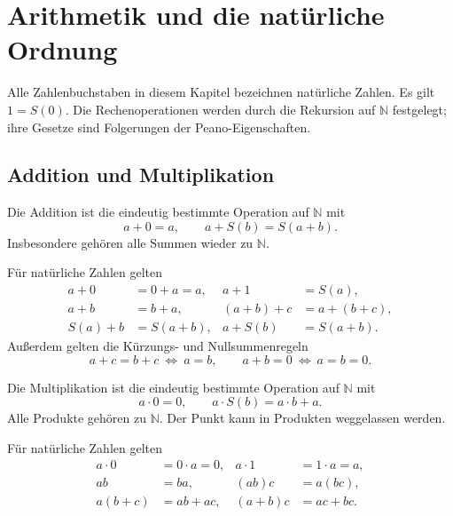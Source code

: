 \chapter{Arithmetik und die natürliche Ordnung}
\label{b10guide:ch:arithmetic}

Alle Zahlenbuchstaben in diesem Kapitel bezeichnen natürliche
Zahlen. Es gilt $1=S(0)$. Die Rechenoperationen werden durch die
Rekursion auf $\mathbb N$ festgelegt; ihre Gesetze sind Folgerungen
der Peano-Eigenschaften.

\section{Addition und Multiplikation}

\begin{definition}
\label{b10guide:def:addition}
Die Addition ist die eindeutig bestimmte Operation auf $\mathbb N$ mit
\[
 a+0=a,\qquad a+S(b)=S(a+b).
\]
Insbesondere gehören alle Summen wieder zu $\mathbb N$.
\end{definition}

\begin{theorem}
\label{b10guide:thm:addition-laws}
Für natürliche Zahlen gelten
\[
 \begin{aligned}
 a+0&=0+a=a, & a+1&=S(a),\\
 a+b&=b+a, & (a+b)+c&=a+(b+c),\\
 S(a)+b&=S(a+b), & a+S(b)&=S(a+b).
 \end{aligned}
\]
Außerdem gelten die Kürzungs- und Nullsummenregeln
\[
 a+c=b+c\ \Longleftrightarrow\ a=b,
 \qquad
 a+b=0\ \Longleftrightarrow\ a=b=0.
\]
\end{theorem}

\begin{definition}
\label{b10guide:def:multiplication}
Die Multiplikation ist die eindeutig bestimmte Operation auf
$\mathbb N$ mit
\[
 a\cdot0=0,\qquad a\cdot S(b)=a\cdot b+a.
\]
Alle Produkte gehören zu $\mathbb N$. Der Punkt kann in Produkten
weggelassen werden.
\end{definition}

\begin{theorem}
\label{b10guide:thm:multiplication-laws}
Für natürliche Zahlen gelten
\[
 \begin{aligned}
 a\cdot0&=0\cdot a=0, & a\cdot1&=1\cdot a=a,\\
 ab&=ba, & (ab)c&=a(bc),\\
 a(b+c)&=ab+ac, & (a+b)c&=ac+bc.
 \end{aligned}
\]
\end{theorem}

